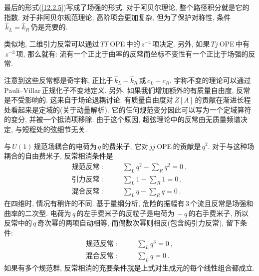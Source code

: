 最后的形式(\ref{12.2.5})写成了场强的形式. 对于阿贝尔理论, 整个路径积分就是它的指数. 对于非阿贝尔规范理论, 高阶项会更加复杂, 但为了保护对称性, 条件$\,\hat{k}_{L}=\hat{k}_{R}\,$仍是充要的.

类似地, 二维引力反常可以通过$\,TT\:$OPE\,中的$\,z^{-4}\,$项决定. 另外, 如果$\,Tj\:$OPE\,中有$\,z^{-3}\,$项, 那么就有{}: 流有一个正比于曲率的反常而坐标不变性有一个正比于场强的反常.

注意到这些反常都是奇宇称, 正比于$\,\hat{k}_{L}-\hat{k}_{R}\,$或$\,c_{L}-c_{R}$. 宇称不变的理论可以通过\,Pauli--Villar\,正规化子不变地定义. 另外, 如果我们增加额外的有质量自由度, 反常是不受影响的. 这来自于场论退耦讨论. 有质量自由度对$\,Z[A]\,$的贡献在渐进长程处看起来是定域的(关于动量解析). 它的任何规范变分因此可以写为一个定域算符的变分, 并被一个抵消项移除. 由于这个原因, 超弦理论中的反常由无质量频谱决定, 与短程处的弦细节无关.

与$\,U(1)\,$规范场耦合的电荷为$\,q\,$的费米子, 它对$\,jj\:$OPE\,的贡献是$\,q^{2}$. 对于与这种场耦合的自由费米子, 反常相消条件是
\begin{subequations}
    \begin{align}
        \text{规范反常}\::&\qquad  \sum_{L}q^{2}-\sum_{R}q^{2}=0 \:, \label{12.2.6a} \\
        \text{引力反常}\::&\qquad  \sum_{L}1-\sum_{R}1=0 \:, \label{12.2.6b} \\
        \text{混合反常}\::&\qquad  \sum_{L}q-\sum_{R}q=0 \:. \label{12.2.6c}
    \end{align} \label{12.2.6}
\end{subequations}
在四维时, 情况有稍许的不同. 基于量纲分析, 危险的振幅有\,3\,个流且反常是场强和曲率的二次型. 电荷为$\,q\,$的左手费米子的反粒子是电荷为$\,-q\,$的右手费米子, 所以反常中的$\,q\,$奇次幂的两项自动相等, 而偶数次幂则相反(包含纯引力反常), 留下条件:
\begin{subequations}
    \begin{align}
        \text{规范反常}\::&\qquad  \sum_{L}q^{3}=0 \:, \label{12.2.7a} \\
        \text{混合反常}\::&\qquad  \sum_{L}q=0 \:. \label{12.2.7b}
    \end{align} \label{12.2.7}
\end{subequations}
如果有多个规范群, 反常相消的充要条件就是上式对生成元的每个线性组合都成立.

